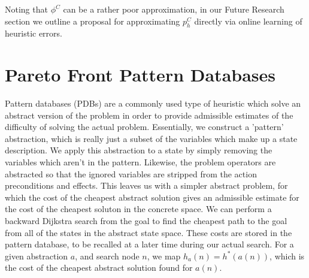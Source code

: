 \documentclass[letterpaper]{article} %
\begin{document}
Noting that \(\phi^C\) can be a rather poor approximation, in our Future Research section we outline a proposal for approximating \(p^C_h\)
directly via online learning of heuristic errors.

\section{Pareto Front Pattern Databases}

Pattern databases (PDBs) \cite{culberson1996searching} are a commonly used type of heuristic
which solve an abstract version of the problem
in order to provide admissible estimates of the difficulty of
solving the actual problem. Essentially, we construct a 'pattern' abstraction,
which is really just a subset of the variables which make up a state description.
We apply this abstraction to a state by simply removing the variables
which aren't in the pattern.
Likewise, the problem operators are abstracted so that the ignored variables
are stripped from the action preconditions and effects.
This leaves us with a simpler abstract problem,
for which the cost of the cheapest abstract solution gives
an admissible estimate for the cost of the cheapest soluton in the concrete space.
We can perform a backward Dijkstra
search from the goal to find the cheapest path to the goal from
all of the states in the abstract state space. These costs are stored in the pattern database,
to be recalled at a later time during our actual search.
For a given abstraction \(a\), and search node \(n\), we map \(h_a(n) = h^*(a(n))\), which is the cost of the cheapest abstract solution found for \(a(n)\).
\end{document}

